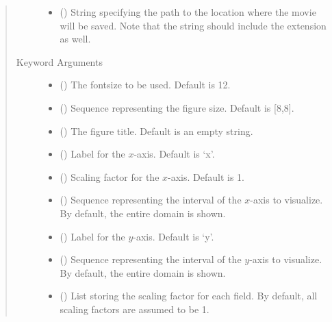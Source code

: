\documentclass[letterpaper,10pt,english]{sphinxmanual}
\begin{document}
\begin{fulllineitems}
\begin{quote}
\begin{description}
\begin{itemize}
\begin{itemize}
\end{itemize}


\item {} 
 () \textendash{} String specifying the path to the location where the movie will be saved.
Note that the string should include the extension as well.

\end{itemize}

\item[{Keyword Arguments}] \leavevmode\begin{itemize}
\item {} 
 () \textendash{} The fontsize to be used. Default is 12.

\item {} 
 () \textendash{} Sequence representing the figure size. Default is {[}8,8{]}.

\item {} 
 () \textendash{} The figure title. Default is an empty string.

\item {} 
 () \textendash{} Label for the \(x\)-axis. Default is ‘x’.

\item {} 
 () \textendash{} Scaling factor for the \(x\)-axis. Default is 1.

\item {} 
 () \textendash{} Sequence representing the interval of the \(x\)-axis to visualize.
By default, the entire domain is shown.

\item {} 
 () \textendash{} Label for the \(y\)-axis. Default is ‘y’.

\item {} 
 () \textendash{} Sequence representing the interval of the \(y\)-axis to visualize.
By default, the entire domain is shown.

\item {} 
 () \textendash{} List storing the scaling factor for each field. By default, all scaling factors are assumed to be 1.


\end{itemize}
\end{description}
\end{quote}
\end{fulllineitems}
\end{document}
